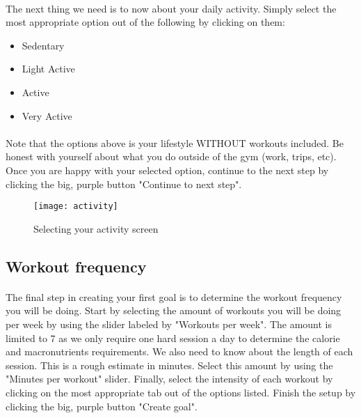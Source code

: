 \documentclass{article}
\begin{document}
\paragraph{}
    The next thing we need is to now about your daily activity. Simply select the most appropriate option out of the following by clicking on them:

    \begin{itemize}
        \item Sedentary
        \item Light Active
        \item Active
        \item Very Active
    \end{itemize}

\paragraph{}
    Note that the options above is your lifestyle WITHOUT workouts included. Be honest with yourself about what you do outside of the gym (work, trips, etc).
    Once you are happy with your selected option, continue to the next step by clicking the big, purple
    button "Continue to next step".
   
    \hfill \break
    
    \begin{figure}[h!]
        \texttt{[image: activity]}
        \centering
        \caption{Selecting your activity screen}
    \end{figure}
    \newpage

\subsection{Workout frequency}
\paragraph{}
    The final step in creating your first goal is to determine the workout frequency you will be doing. Start by selecting the amount of workouts you will be doing
    per week by using the slider labeled by "Workouts per week". The amount is limited to 7 as we only require one hard session a day to determine the calorie and 
    macronutrients requirements. We also need to know about the length of each session. This is a rough estimate in minutes. Select this amount by using the 
    "Minutes per workout" slider. Finally, select the intensity of each workout by clicking on the most appropriate tab out of the options listed. 
    Finish the setup by clicking the big, purple button "Create goal".
  
\end{document}
